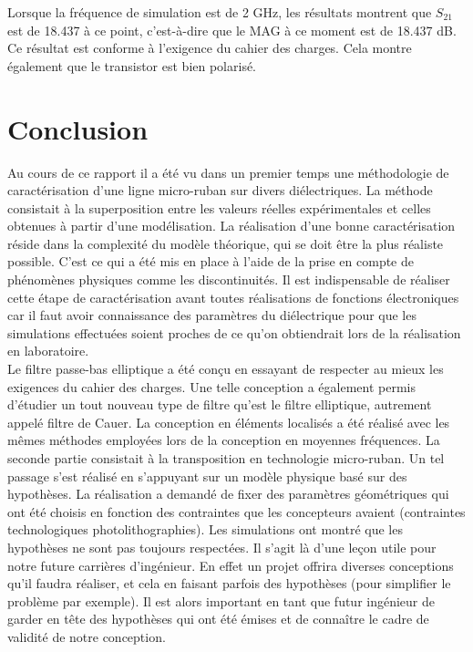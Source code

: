 \documentclass[french]{article}
\begin{document}
Lorsque la fréquence de simulation est de 2 GHz, les résultats montrent que $S_{21}$ est de 18.437 à ce point, c'est-à-dire que le MAG à ce moment est de 18.437 dB. Ce résultat est conforme à l'exigence du cahier des charges. Cela montre également que le transistor est bien polarisé.


\newpage
\section{Conclusion}

Au cours de ce rapport il a été vu dans un premier temps une méthodologie de caractérisation d'une ligne micro-ruban sur divers diélectriques. La méthode consistait à la superposition entre les valeurs réelles expérimentales et celles obtenues à partir d'une modélisation. La réalisation d'une bonne caractérisation réside dans la complexité du modèle théorique, qui se doit être la plus réaliste possible. C'est ce qui a été mis en place à l'aide de la prise en compte de phénomènes physiques comme les discontinuités. Il est indispensable de réaliser cette étape de caractérisation avant toutes réalisations de fonctions électroniques car il faut avoir connaissance des paramètres du diélectrique pour que les simulations effectuées soient proches de ce qu'on obtiendrait lors de la réalisation en laboratoire.\\

Le filtre passe-bas elliptique a été conçu en essayant de respecter au mieux les exigences du cahier des charges. Une telle conception a également permis d'étudier un tout nouveau type de filtre qu'est le filtre elliptique, autrement appelé filtre de Cauer. La conception en éléments localisés a été réalisé avec les mêmes méthodes employées lors de la conception en moyennes fréquences. La seconde partie consistait à la transposition en technologie micro-ruban. Un tel passage s'est réalisé en s'appuyant sur un modèle physique basé sur des hypothèses. La réalisation a demandé de fixer des paramètres géométriques qui ont été choisis en fonction des contraintes que les concepteurs avaient (contraintes technologiques photolithographies). Les simulations ont montré que les hypothèses ne sont pas toujours respectées. Il s'agit là d'une leçon utile pour notre future carrières d'ingénieur. En effet un projet offrira diverses conceptions qu'il faudra réaliser, et cela en faisant parfois des hypothèses (pour simplifier le problème par exemple). Il est alors important en tant que futur ingénieur de garder en tête des hypothèses qui ont été émises et de connaître le cadre de validité de notre conception.\\
\end{document}
